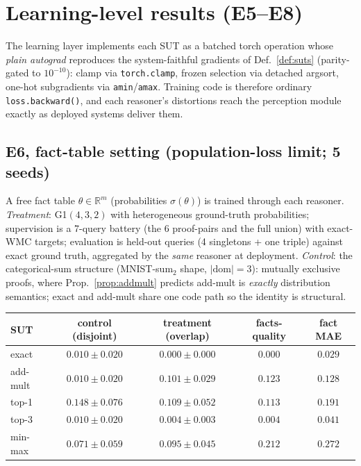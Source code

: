 \documentclass[10pt]{article}
\theoremstyle{remark}
\begin{document}
\section{Learning-level results (E5--E8)}\label{sec:learning}

The learning layer implements each SUT as a batched torch operation whose \emph{plain autograd}
reproduces the system-faithful gradients of Def.~\ref{def:suts} (parity-gated to $10^{-10}$):
clamp via \texttt{torch.clamp}, frozen selection via detached argsort, one-hot subgradients via
\texttt{amin}/\texttt{amax}. Training code is therefore ordinary \texttt{loss.backward()}, and
each reasoner's distortions reach the perception module exactly as deployed systems deliver them.

\subsection{E6, fact-table setting (population-loss limit; 5 seeds)}

A free fact table $\theta \in \mathbb{R}^m$ (probabilities $\sigma(\theta)$) is trained through
each reasoner. \emph{Treatment}: G1$(4,3,2)$ with heterogeneous ground-truth probabilities;
supervision is a 7-query battery (the 6 proof-pairs and the full union) with exact-WMC targets;
evaluation is held-out queries (4 singletons + one triple) against exact ground truth, aggregated
by the \emph{same} reasoner at deployment. \emph{Control}: the categorical-sum structure
(MNIST-sum$_2$ shape, $\lvert\text{dom}\rvert = 3$): mutually exclusive proofs, where
Prop.~\ref{prop:addmult} predicts add-mult is \emph{exactly} distribution semantics; exact and
add-mult share one code path so the identity is structural.

\begin{center}\small
\begin{tabular}{lcccc}
\toprule
SUT & control (disjoint) & treatment (overlap) & facts-quality & fact MAE\\
\midrule
exact & $0.010 \pm 0.020$ & $0.000 \pm 0.000$ & $0.000$ & $0.029$\\
add-mult & $0.010 \pm 0.020$ & $0.101 \pm 0.029$ & $0.123$ & $0.128$\\
top-1 & $0.148 \pm 0.076$ & $0.109 \pm 0.052$ & $0.113$ & $0.191$\\
top-3 & $0.010 \pm 0.020$ & $0.004 \pm 0.003$ & $0.004$ & $0.041$\\
min-max & $0.071 \pm 0.059$ & $0.095 \pm 0.045$ & $0.212$ & $0.272$\\
\bottomrule
\end{tabular}
\end{center}
\end{document}
